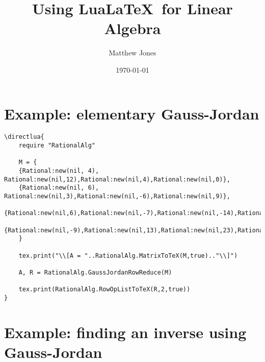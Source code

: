 \documentclass[11pt]{article}
\title{Using Lua\LaTeX\ for Linear Algebra}
\author{Matthew Jones}
\date{\today}
\begin{document}
\maketitle

\section*{Example: elementary Gauss-Jordan}

\begin{lstlisting}
\directlua{
    require "RationalAlg"
    
    M = {
    {Rational:new(nil, 4), Rational:new(nil,12),Rational:new(nil,4),Rational:new(nil,0)},
    {Rational:new(nil, 6), Rational:new(nil,3),Rational:new(nil,-6),Rational:new(nil,9)},
    {Rational:new(nil,6),Rational:new(nil,-7),Rational:new(nil,-14),Rational:new(nil,15)},
    {Rational:new(nil,-9),Rational:new(nil,13),Rational:new(nil,23),Rational:new(nil,-24)}
    }

    tex.print("\\[A = "..RationalAlg.MatrixToTeX(M,true).."\\]")

    A, R = RationalAlg.GaussJordanRowReduce(M)
    
    tex.print(RationalAlg.RowOpListToTeX(R,2,true))
}    
\end{lstlisting}


\pagebreak
\section*{Example: finding an inverse using Gauss-Jordan}
\end{document}
